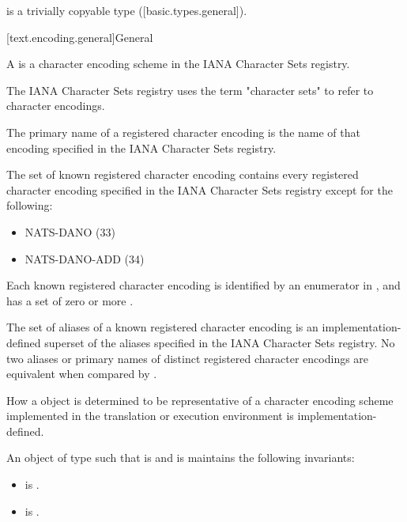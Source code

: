 \documentclass{wg21}
\begin{document}
\begin{addedblock}


 is a trivially copyable type ([basic.types.general]).

[text.encoding.general]{General}

\pnum A  is a character encoding scheme in the IANA Character Sets registry.
\begin{note}
    The IANA Character Sets registry uses the term "character sets" to refer to character encodings.
\end{note}
The primary name of a registered character encoding is the name of that encoding specified in the IANA Character Sets registry.



The set of known registered character encoding contains every registered character encoding specified in the IANA Character Sets registry except for the following:
\begin{itemize}
\item NATS-DANO (33)
\item NATS-DANO-ADD	(34)
\end{itemize}

Each known registered character encoding is identified by an enumerator in , and has a set of zero or more .

The set of aliases of a known registered character encoding is an implementation-defined superset of the aliases specified in the IANA Character Sets registry.
No two aliases or primary names of distinct registered character encodings are equivalent when compared by .


How a  object is determined to be representative of a character encoding scheme implemented in the translation or execution environment is implementation-defined.


An object  of type  such that  is  and  is  maintains the following invariants:
\begin{itemize}
\item {} is .
\item {} is .
\end{itemize}


\end{addedblock}
\end{document}
